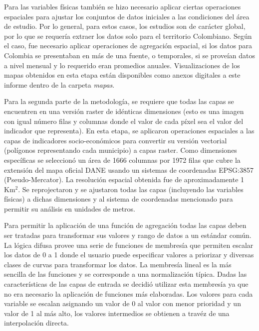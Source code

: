Para las variables físicas también se hizo necesario aplicar ciertas operaciones espaciales para ajustar los conjuntos de datos iniciales a las condiciones del 
área de estudio.  Por lo general, para estos casos, los estudios son de carácter global, por lo que se requería extraer los datos solo para el territorio 
Colombiano.  Según el caso, fue necesario aplicar operaciones de agregación espacial, si los datos para Colombia se presentaban en más de una fuente, o 
temporales, si se proveían datos a nivel mensual y lo requerido eran promedios anuales.  Visualizaciones de los mapas obtenidos en esta etapa están disponibles 
como anexos digitales a este informe dentro de la carpeta \textit{mapas}.

Para la segunda parte de la metodología, se requiere que todas las capas se encuentren en una versión raster de idénticas dimensiones (esto es 
una imagen con igual número filas y columnas donde el valor de cada píxel sea el valor del indicador que representa).  En esta etapa, se aplicaron operaciones 
espaciales a las capas de indicadores socio-económicos para convertir su versión vectorial (polígonos representando cada municipio) a capas raster.  Como 
dimensiones específicas se seleccionó un área de 1666 columnas por 1972 filas que cubre la extensión del mapa oficial DANE usando un sistemas de coordenadas 
EPSG:3857 (Pseudo-Mercator).  La resolución espacial obtenida fue de aproximadamente 1 Km$^2$.  Se reprojectaron y se ajustaron todas las capas (incluyendo las 
variables físicas) a dichas dimensiones y al sistema de coordenadas mencionado para permitir su análisis en unidades de metros.

Para permitir la aplicación de una función de agregación todas las capas deben ser tratadas para transformar sus valores y rango de datos a un estándar común.  
La lógica difusa provee una serie de funciones de membresía que permiten escalar los datos de 0 a 1 donde el usuario puede especificar valores a priorizar y 
diversas clases de curvas para transformar los datos.  La membresía lineal es la más sencilla de las funciones y se corresponde a una normalización típica.  
Dadas las características de las capas de entrada se decidió utilizar esta membresía ya que no era necesario la aplicación de funciones más elaboradas. 
Los valores para cada variable se escalan asignando un valor de 0 al valor con menor prioridad y un valor de 1 al más alto, los valores intermedios se obtienen 
a travéz de una interpolación directa.  

